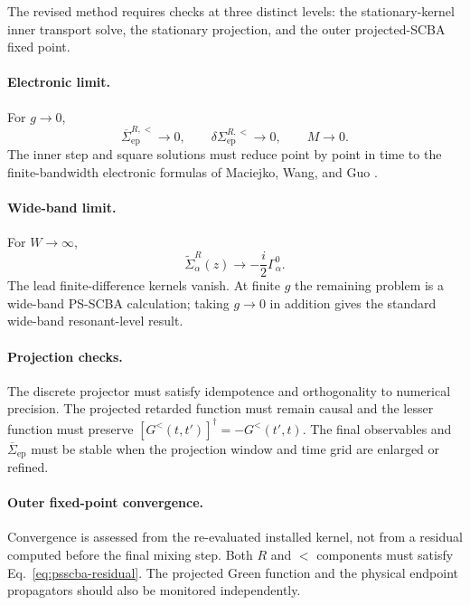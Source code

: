 \documentclass[
 reprint,
 superscriptaddress,
 amsmath,amssymb,
 aps,prb,
 longbibliography,
 floatfix
]{revtex4-2}
\newcommand{\ep}{\mathrm{ep}}
\newcommand{\barSigma}{\overline{\Sigma}}
\begin{document}
The revised method requires checks at three distinct levels: the stationary-kernel inner transport solve, the stationary projection, and the outer projected-SCBA fixed point.

\paragraph{Electronic limit.}
For \(g\to0\),
\begin{equation*}
\barSigma_{\ep}^{R,<}\rightarrow0,
\qquad
\delta\Sigma_{\ep}^{R,<}\rightarrow0,
\qquad
M\rightarrow0.
\end{equation*}
The inner step and square solutions must reduce point by point in time to the finite-bandwidth electronic formulas of Maciejko, Wang, and Guo \cite{MaciejkoWangGuo2006}.

\paragraph{Wide-band limit.}
For \(W\to\infty\),
\begin{equation*}
\widetilde\Sigma_\alpha^R(z)
\rightarrow
-\frac{i}{2}\Gamma_\alpha^0.
\end{equation*}
The lead finite-difference kernels vanish. At finite \(g\) the remaining problem is a wide-band PS-SCBA calculation; taking \(g\to0\) in addition gives the standard wide-band resonant-level result.

\paragraph{Projection checks.}
The discrete projector must satisfy idempotence and orthogonality to numerical precision. The projected retarded function must remain causal and the lesser function must preserve
\([G^<(t,t')]^\dagger=-G^<(t',t)\).
The final observables and \(\barSigma_{\ep}\) must be stable when the projection window and time grid are enlarged or refined.

\paragraph{Outer fixed-point convergence.}
Convergence is assessed from the re-evaluated installed kernel, not from a residual computed before the final mixing step. Both \(R\) and \(<\) components must satisfy Eq.~\eqref{eq:psscba-residual}. The projected Green function and the physical endpoint propagators should also be monitored independently.
\end{document}
